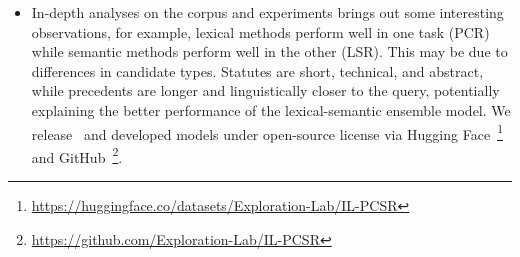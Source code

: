 \begin{itemize}[noitemsep,nosep,leftmargin=*]
\item In-depth analyses on the corpus and experiments brings out some interesting observations, for example, lexical methods perform well in one task (PCR) while semantic methods perform well in the other (LSR). 
This may be due to differences in candidate types. Statutes are short, technical, and abstract, while precedents are longer and linguistically closer to the query, potentially explaining the better performance of the lexical-semantic ensemble model.
We release \ilpcsr\ and developed models under open-source license via Hugging Face~\footnote{\url{https://huggingface.co/datasets/Exploration-Lab/IL-PCSR}} and GitHub~\footnote{\url{https://github.com/Exploration-Lab/IL-PCSR}}. %

\end{itemize}
